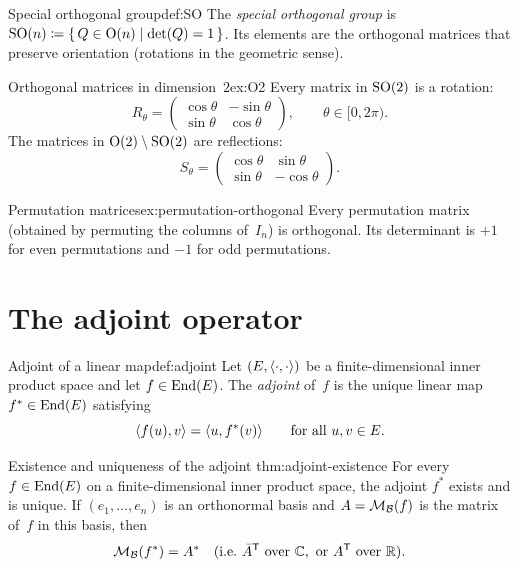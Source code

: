 \begin{definition}{Special orthogonal group}{def:SO}
The \emph{special orthogonal group} is
$\operatorname{SO}(n) \coloneqq \left\{\,Q\in\operatorname{O}(n)\;\middle|\;\det(Q) = 1\,\right\}$.
Its elements are the orthogonal matrices that preserve orientation
(rotations in the geometric sense).
\end{definition}

\begin{example}{Orthogonal matrices in dimension~$2$}{ex:O2}
Every matrix in $\operatorname{SO}(2)$ is a rotation:
\[
  R_\theta = \begin{pmatrix} \cos\theta & -\sin\theta \\
    \sin\theta & \cos\theta \end{pmatrix},
  \qquad \theta\in[0,2\pi).
\]
The matrices in $\operatorname{O}(2)\setminus\operatorname{SO}(2)$ are reflections:
\[
  S_\theta = \begin{pmatrix} \cos\theta & \sin\theta \\
    \sin\theta & -\cos\theta \end{pmatrix}.
\]
\end{example}

\begin{example}{Permutation matrices}{ex:permutation-orthogonal}
Every permutation matrix (obtained by permuting the columns of~$I_n$)
is orthogonal.  Its determinant is $+1$ for even permutations and $-1$
for odd permutations.
\end{example}


\section{The adjoint operator}\label{sec:adjoint}

\begin{definition}{Adjoint of a linear map}{def:adjoint}
Let $(E,\langle\cdot,\cdot\rangle)$ be a finite-dimensional inner product
space and let $f\in\operatorname{End}(E)$.  The \emph{adjoint} of~$f$ is the unique
linear map $f^*\in\operatorname{End}(E)$ satisfying
\[
  \langle f(u),v\rangle = \langle u,f^*(v)\rangle
  \qquad\text{for all } u,v\in E.
\]
\end{definition}

\begin{theorem}{Existence and uniqueness of the adjoint}%
{thm:adjoint-existence}
For every $f\in\operatorname{End}(E)$ on a finite-dimensional inner product space, the
adjoint $f^*$ exists and is unique.  If $(e_1,\ldots,e_n)$ is an
orthonormal basis and $A = \mathcal{M}_{{\mathcal{B}}}(f)$ is the matrix of~$f$ in this
basis, then
\[
  \mathcal{M}_{{\mathcal{B}}}(f^*) = {A}^{*} \quad
  (\text{i.e.\ } {\bar{A}}^{\mathsf{T}} \text{ over } {\mathbb{C}}, \text{ or }
  {A}^{\mathsf{T}} \text{ over } {\mathbb{R}}).
\]
\end{theorem}

